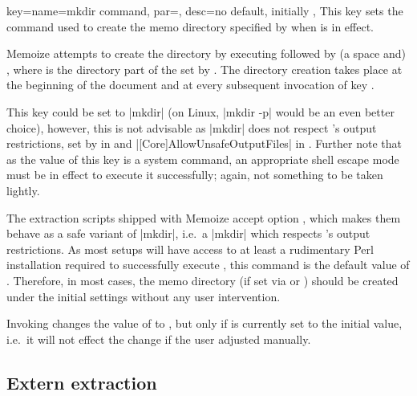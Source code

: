 \documentclass[a4paper,11pt]{article}
\begin{document}
\begin{doc}{
    key={name=mkdir command, par=,
      desc={no default, initially }},
  }
  This key sets the command used to create the memo directory specified
  by  when  is in effect.

  Memoize attempts to create the directory by executing 
  followed by (a space and) , where  is the
  directory part of the  set by .  The directory
  creation takes place at the beginning of the document and at every subsequent
  invocation of key .

  This key could be set to |mkdir| (on Linux, |mkdir -p| would be an even
  better choice), however, this is not advisable as |mkdir| does not respect
  's output restrictions, set by  in
  \TeXLive and |[Core]AllowUnsafeOutputFiles| in \MiKTeX.
  Further note that as the value of this key is a system command, an
  appropriate shell escape mode must be in effect to execute it successfully;
  again, not something to be taken lightly.

  The extraction scripts shipped with Memoize accept option
  , which makes them behave as a safe
  variant of |mkdir|, i.e.\ a |mkdir| which respects 's output
  restrictions.  As most  setups will have access to at least a
  rudimentary Perl installation required to successfully execute
  ,
  this command is the default value of .  Therefore, in
  most cases, the memo directory (if set via  or ) should be created under the initial settings without any user
  intervention.

  Invoking  changes the value of
   to , but only if 
  is currently set to the initial value, i.e.\ it will not effect the change if
  the user adjusted  manually.
\end{doc}


\subsection{Extern extraction}
\label{sec:ref:externs}
\end{document}
